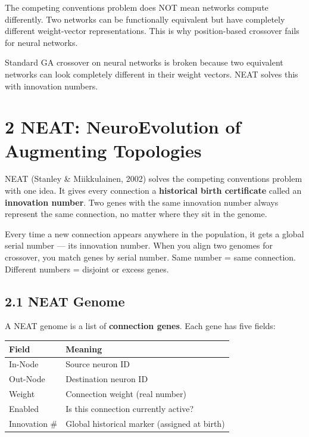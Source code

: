 \documentclass[a4paper,11pt]{article}
\begin{document}
\begin{watchout}
The competing conventions problem does NOT mean networks compute differently. Two networks can be functionally equivalent but have completely different weight-vector representations. This is why position-based crossover fails for neural networks.
\end{watchout}

\begin{keytake}
Standard GA crossover on neural networks is broken because two equivalent networks can look completely different in their weight vectors. NEAT solves this with innovation numbers.
\end{keytake}

\section{2 \quad NEAT: NeuroEvolution of Augmenting Topologies}

NEAT (Stanley \& Miikkulainen, 2002) solves the competing conventions problem with one idea.
It gives every connection a \textbf{historical birth certificate} called an \textbf{innovation number}.
Two genes with the same innovation number always represent the same connection, no matter where they sit in the genome.

\begin{intuition}
Every time a new connection appears anywhere in the population, it gets a global serial number — its innovation number. When you align two genomes for crossover, you match genes by serial number. Same number = same connection. Different numbers = disjoint or excess genes.
\end{intuition}

\subsection{2.1 NEAT Genome}

A NEAT genome is a list of \textbf{connection genes}. Each gene has five fields:

\begin{center}
\begin{tabular}{lp{8cm}}
\toprule
\textbf{Field} & \textbf{Meaning} \\
\midrule
In-Node & Source neuron ID \\
Out-Node & Destination neuron ID \\
Weight & Connection weight (real number) \\
Enabled & Is this connection currently active? \\
Innovation \# & Global historical marker (assigned at birth) \\
\bottomrule
\end{tabular}
\end{center}
\end{document}
